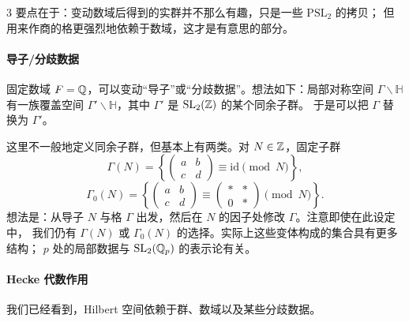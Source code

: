 \begin{srcrem}{3}
要点在于：变动数域后得到的实群并不那么有趣，只是一些 $\mathrm{PSL}_2$ 的拷贝；
但用来作商的格更强烈地依赖于数域，这才是有意思的部分。
\end{srcrem}

\paragraph{导子/分歧数据}
固定数域 $F=\mathbb{Q}$，可以变动“导子”或“分歧数据”。想法如下：局部对称空间 $\Gamma\backslash\mathbb{H}$
有一族覆盖空间 $\Gamma'\backslash\mathbb{H}$，其中 $\Gamma'$ 是 $\mathrm{SL}_2(\mathbb{Z})$ 的某个同余子群。
于是可以把 $\Gamma$ 替换为 $\Gamma'$。

这里不一般地定义同余子群，但基本上有两类。对 $N\in\mathbb{Z}$，固定子群
\begin{equation}\tag{1.15}\label{eq:1.15}
\Gamma(N)=\left\{\begin{pmatrix}a&b\\ c&d\end{pmatrix}\equiv \mathrm{id}\pmod N\right\},
\end{equation}
\begin{equation}\tag{1.16}\label{eq:1.16}
\Gamma_0(N)=\left\{\begin{pmatrix}a&b\\ c&d\end{pmatrix}
  \equiv\begin{pmatrix}*&*\\ 0&*\end{pmatrix}\pmod N\right\}.
\end{equation}
想法是：从导子 $N$ 与格 $\Gamma$ 出发，然后在 $N$ 的因子处修改 $\Gamma$。注意即使在此设定中，
我们仍有 $\Gamma(N)$ 或 $\Gamma_0(N)$ 的选择。实际上这些变体构成的集合具有更多结构；
$p$ 处的局部数据与 $\mathrm{SL}_2(\mathbb{Q}_p)$ 的表示论有关。

\paragraph{Hecke 代数作用}
我们已经看到，Hilbert 空间依赖于群、数域以及某些分歧数据。

